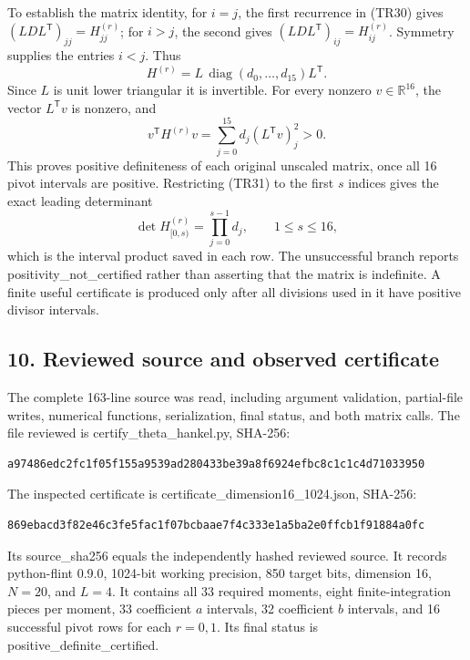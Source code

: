 To establish the matrix identity, for \(i=j\), the first recurrence in (TR30) gives \((LDL^{\mathsf T})_{jj}=H^{(r)}_{jj}\); for \(i>j\), the second gives \((LDL^{\mathsf T})_{ij}=H^{(r)}_{ij}\). Symmetry supplies the entries \(i<j\). Thus \[
 H^{(r)}=L\,\operatorname{diag}(d_0,\ldots,d_{15})L^{\mathsf T}.
 \tag{TR31}
\] Since \(L\) is unit lower triangular it is invertible. For every nonzero \(v\in\mathbb R^{16}\), the vector \(L^{\mathsf T}v\) is nonzero, and \[
 v^{\mathsf T}H^{(r)}v
 =\sum_{j=0}^{15}d_j(L^{\mathsf T}v)_j^2>0.
 \tag{TR32}
\] This proves positive definiteness of each original unscaled matrix, once all 16 pivot intervals are positive. Restricting (TR31) to the first \(s\) indices gives the exact leading determinant \[
 \det H^{(r)}_{[0,s)}
 =\prod_{j=0}^{s-1}d_j,\qquad1\leq s\leq16,
 \tag{TR33}
\] which is the interval product saved in each row. The unsuccessful branch reports positivity\_not\_certified rather than asserting that the matrix is indefinite. A finite useful certificate is produced only after all divisions used in it have positive divisor intervals.

\subsection{10. Reviewed source and observed certificate}\label{C47stage:TR:reviewed-source-and-observed-certificate}

The complete 163-line source was read, including argument validation, partial-file writes, numerical functions, serialization, final status, and both matrix calls. The file reviewed is certify\_theta\_hankel.py, SHA-256:

\begin{lstlisting}
a97486edc2fc1f05f155a9539ad280433be39a8f6924efbc8c1c1c4d71033950
\end{lstlisting}

The inspected certificate is certificate\_dimension16\_1024.json, SHA-256:

\begin{lstlisting}
869ebacd3f82e46c3fe5fac1f07bcbaae7f4c333e1a5ba2e0ffcb1f91884a0fc
\end{lstlisting}

Its source\_sha256 equals the independently hashed reviewed source. It records python-flint 0.9.0, 1024-bit working precision, 850 target bits, dimension 16, \(N=20\), and \(L=4\). It contains all 33 required moments, eight finite-integration pieces per moment, 33 coefficient \(a\) intervals, 32 coefficient \(b\) intervals, and 16 successful pivot rows for each \(r=0,1\). Its final status is positive\_definite\_certified.

